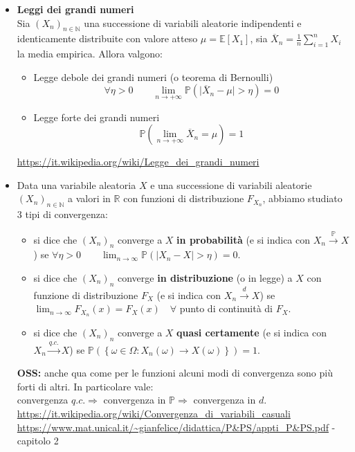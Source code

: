 \documentclass[12pt,a4paper]{report}
\begin{document}
\begin{itemize}
\item \textbf{Leggi dei grandi numeri}\\
Sia \( \left(X_{n}\right)_{n \in \mathbb{N}} \) una successione di variabili aleatorie indipendenti e identicamente distribuite con valore atteso \(\mu=\mathbb{E}[X_1]\), \quad sia \(\overline{X}_{n}=\frac{1}{n}\sum_{i=1}^n X_{i}\) la media empirica. Allora valgono:
\begin{itemize}
\item {Legge debole dei grandi numeri (o teorema di Bernoulli)}
\[ \forall \eta >0 \qquad \lim_{n \to +\infty} \mathbb{P} \left( | \overline{X}_{n} - \mu \mid > \eta\right)=0 \]
\item {Legge forte dei grandi numeri}
\[ \mathbb{P} \left( \lim_{n \to +\infty} \overline{X}_{n}=\mu \right)=1\]
\end{itemize}
\url{https://it.wikipedia.org/wiki/Legge_dei_grandi_numeri}

\item Data una variabile aleatoria \(X\) e una successione di  variabili aleatorie \( \left(X_{n}\right)_{n \in \mathbb{N}} \) a valori in \(\mathbb{R}\) con funzioni di distribuzione \(F_{X_{n}}\), abbiamo studiato 3 tipi di convergenza:
\begin{itemize}

\item si dice che \( \left(X_{n}\right)_{n} \) converge a \(X\) \textbf{in probabilità} (e si indica con \(X_{n} \stackrel{\mathbb{P}}{\to}X \)) se \quad \( \forall \eta >0  \qquad \lim_{n \to \infty} \mathbb{P}\left(\mid X_{n} - X \mid > \eta \right)=0\).

\item si dice che \( \left(X_{n}\right)_{n} \) converge \textbf{in distribuzione} (o in legge) a \(X\) con funzione di distribuzione \(F_{X}\) (e si indica con \(X_{n} \stackrel{d}{\to} X \)) se \quad \( \lim_{n \to \infty} F_{X_{n}}(x)=F_{X}(x) \quad \forall\) punto di continuità di \(F_{X}\).

\item si dice che \( \left(X_{n}\right)_{n} \) converge a \(X\) \textbf{quasi certamente} (e si indica con \(X_{n} \stackrel{q.c.}{\to}X \)) se \quad \(\mathbb{P}\left( \left\lbrace \omega \in \Omega : X_{n}(\omega) \to X(\omega) \right\rbrace \right) =1\).
\end{itemize}
\textbf{OSS:} anche qua come per le funzioni alcuni modi di convergenza sono più forti di altri. In particolare vale:\\
convergenza \(q.c. \Rightarrow \) convergenza in \(\mathbb{P} \Rightarrow\) convergenza in \(d\).\\
\url{https://it.wikipedia.org/wiki/Convergenza_di_variabili_casuali}\\
\url{https://www.mat.unical.it/~gianfelice/didattica/P&PS/appti_P&PS.pdf} - capitolo 2


\end{itemize}
\end{document}
